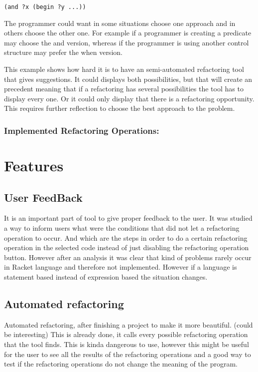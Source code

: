 \begin{lstlisting}[caption="Example"]
(and ?x (begin ?y ...))
\end{lstlisting}

The programmer could want in some situations choose one approach and in others
choose the other one. For example if a programmer is creating a predicate may
choose the and version, whereas if the programmer is using another control structure
may prefer the when version.

This example shows how hard it is to have an semi-automated refactoring tool
that gives suggestions.
It could displays both possibilities, but that will create an precedent meaning
that if a refactoring has several possibilities the tool has to display every one.
Or it could only display that there is a refactoring opportunity.
This requires further reflection to choose the best approach to the problem.


\subsubsection{Implemented Refactoring Operations:}

\section{Features}

\subsection{User FeedBack}
It is an important part of tool to give proper feedback to the user. It was studied
a way to inform users what were the conditions that did not let a refactoring operation
to occur. And which are the steps in order to do a certain refactoring
operation in the selected code instead of just disabling the refactoring operation
button. However after an analysis it was clear that kind of problems rarely occur
in Racket language and therefore not implemented. However if a language is statement
based instead of expression based the situation changes.

\subsection{Automated refactoring}
Automated refactoring, after finishing a project to make it more beautiful. (could be interesting)
This is already done, it calls every possible refactoring operation that the tool finds.
This is kinda dangerous to use, however this might be useful for the user to see all the results of the refactoring operations
and a good way to test if the refactoring operations do not change the meaning of the program.


